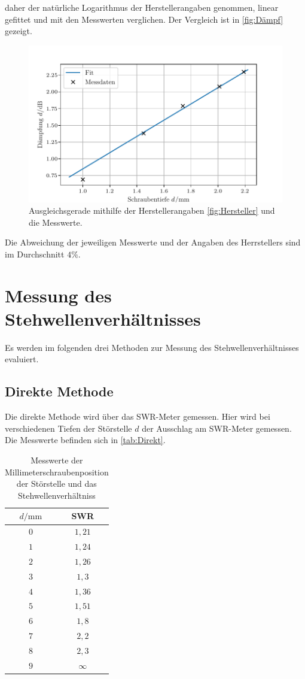 daher der natürliche Logarithmus der Herstellerangaben genommen, linear gefittet und mit den Messwerten verglichen. Der Vergleich ist in \autoref{fig:Dämpf} gezeigt.
\begin{figure}
    \centering
    \includegraphics[scale=0.7]{content/V53_pictures/dampfung.pdf}
    \caption{Ausgleichsgerade mithilfe der Herstellerangaben \ref{fig:Hersteller} und die Messwerte.}
    \label{fig:Dämpf}
\end{figure}
Die Abweichung der jeweiligen Messwerte und der Angaben des Herrstellers sind im Durchschnitt $4 \%$.
\section{Messung des Stehwellenverhältnisses}
Es werden im folgenden drei Methoden zur Messung des Stehwellenverhältnisses evaluiert.
\subsection{Direkte Methode}

Die direkte Methode wird über das SWR-Meter gemessen. Hier wird bei verschiedenen Tiefen der Störstelle $d$ der Ausschlag am SWR-Meter gemessen. Die Messwerte befinden sich in \autoref{tab:Direkt}.
\begin{table}[htbp] 
    \centering 
    \begin{tabular}{c  c} 
        \toprule $d / \mathrm{mm}$  &  SWR  \\ 
        \midrule 
        $0$  &  $1,21$ \\
        $1$  &  $1,24$ \\
        $2$  &  $1,26$\\
        $3$  &  $1,3$\\
        $4$  &  $1,36$\\
        $5$  &  $1,51$\\
        $6$  &  $1,8$\\
        $7$  &  $2,2$\\
        $8$  &  $2,3$\\
        $9$  &  $\infty$\\
        \bottomrule 
    \end{tabular} 
    \caption[Tabelle]{Messwerte der Millimeterschraubenposition der Störstelle und das Stehwellenverhältniss} 
    \label{tab:Direkt} 
\end{table}

